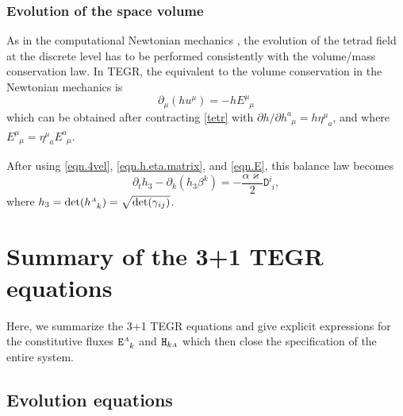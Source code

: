 \documentclass[
10pt, %
a4paper, %
oneside, %
twocolumn,
headinclude,footinclude, %
BCOR5mm, %
]{scrartcl}
\newcommand{\sA}{\mathsmaller A}
\newcommand{\pd}[1]{\partial_{#1}}
\newcommand{\tetrsymbol}{h}
\newcommand{\itetrsymbol}{\eta}
\newcommand{\itetr}[2]{\itetrsymbol^{#1}_{\phantom{#1}#2}}
\newcommand{\tetr}[2]{\tetrsymbol^{#1}_{\phantom{#1}#2}}
\newcommand{\detTetr}{\tetrsymbol}
\newcommand{\ET}[2]{E^{#1}_{\phantom{#1}#2}}	%
\newcommand{\Dfin}[2]{\mathtt{D}_{\phantom{#2}#1}^{#2}}	%
\newcommand{\Hfin}[2]{\mathtt{H}_{#2#1}}	%
\newcommand{\Efin}[2]{\mathtt{E}^{#1}_{\phantom{#1}#2}}	%
\newcommand{\shift}[1]{\beta^{#1}}
\begin{document}
	
	
	\subsubsection{Evolution of the space volume}
	
	As in the computational Newtonian mechanics \cite{DPRZ2016,SIGPR2021}, the evolution of the 
	tetrad 
	field at the discrete level has to be performed consistently with the volume/mass conservation 
	law. 
	In 
	TEGR, the equivalent to the volume conservation in the Newtonian mechanics is 
	\begin{equation}\label{eqn.pde.det}
		\pd{\mu}(\detTetr u^\mu) = -\detTetr \ET{\mu}{\mu} 
	\end{equation} 
	which can be obtained after contracting \eqref{tetr} with $ \partial \detTetr/\partial 
	\tetr{a}{\mu} 
	= \detTetr
	\itetr{\mu}{a} $, and where $ \ET{\mu}{\mu} = \itetr{\mu}{a} \ET{a}{\mu}$.
	
	
	After using \eqref{eqn.4vel}, \eqref{eqn.h.eta.matrix}, and \eqref{eqn.E}, this balance law 
	becomes
	\begin{equation}\label{eqn.h.PDE}
		\pd{t}\detTetr_3 - \pd{k}(\detTetr_3\shift{k} ) =-\frac{\alpha \varkappa}{2} \Dfin{i}{i},
	\end{equation}
	where $ \detTetr_3 =\det(\tetr{\sA}{k}) = \sqrt{\det(\gamma_{ij})} $.
	
	
	
	
	\section{Summary of the 3+1 TEGR equations}\label{sec.summary}
	Here, we summarize the 3+1 TEGR equations and give explicit expressions for the 
	constitutive 
	fluxes $ \Efin{\sA}{k} $ and
	$ \Hfin{\sA}{k} $ which then close the specification of the entire system.
	
	
	\subsection{Evolution equations}
	
\end{document}
